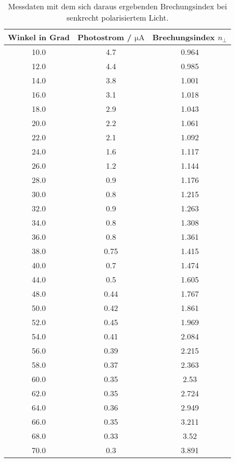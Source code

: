 \begin{table}[H]
    \centering
    \caption{Messdaten mit dem sich daraus ergebenden Brechungsindex bei senkrecht polarisiertem Licht.}
    \label{tab:spolMess}
    \begin{tabular}{c c c}
        \toprule
        Winkel in Grad & Photostrom / $\si{\micro\ampere}$  & Brechungsindex $n_\perp$ \\
        \midrule
        10.0  &  4.7  &  0.964  \\
        12.0  &  4.4  &  0.985  \\
        14.0  &  3.8  &  1.001  \\
        16.0  &  3.1  &  1.018  \\
        18.0  &  2.9  &  1.043  \\
        20.0  &  2.2  &  1.061  \\
        22.0  &  2.1  &  1.092  \\
        24.0  &  1.6  &  1.117  \\
        26.0  &  1.2  &  1.144  \\
        28.0  &  0.9  &  1.176  \\
        30.0  &  0.8  &  1.215  \\
        32.0  &  0.9  &  1.263  \\
        34.0  &  0.8  &  1.308  \\
        36.0  &  0.8  &  1.361  \\
        38.0  &  0.75  &  1.415  \\
        40.0  &  0.7  &  1.474  \\
        44.0  &  0.5  &  1.605  \\
        48.0  &  0.44  &  1.767  \\
        50.0  &  0.42  &  1.861  \\
        52.0  &  0.45  &  1.969  \\
        54.0  &  0.41  &  2.084  \\
        56.0  &  0.39  &  2.215  \\
        58.0  &  0.37  &  2.363  \\
        60.0  &  0.35  &  2.53  \\
        62.0  &  0.35  &  2.724  \\
        64.0  &  0.36  &  2.949  \\
        66.0  &  0.35  &  3.211  \\
        68.0  &  0.33  &  3.52  \\
        70.0  &  0.3  &  3.891  \\

\end{tabular}
\end{table}
